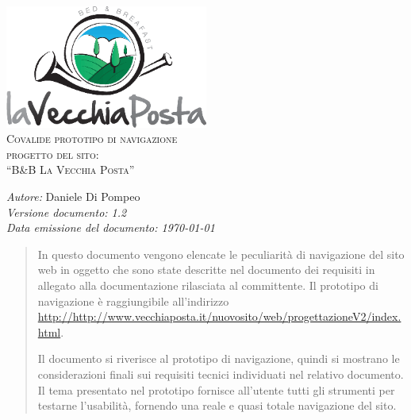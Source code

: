 \documentclass[a4paper,12pt,hidelinks]{report}
\begin{document}
  \begin{titlepage}
    \begin{center}
      \includegraphics[width=0.5\textwidth,keepaspectratio=true]{../../img/logo}\\[1cm]    
      \textsc{\LARGE Covalide prototipo di navigazione}\\[0.6cm]
      \textsc{\LARGE  progetto del sito:\\[0.5cm] ``B\&B La Vecchia Posta''}\\ [2.0cm]

      \begin{minipage}{0.8\textwidth}
	\begin{flushleft} \large
	  \emph{Autore:} Daniele Di Pompeo \\[0.5cm]
	  \emph{Versione documento: 1.2}\\[0.5cm]
	  \emph{Data emissione del documento: \today}\\[0.5cm]
	\end{flushleft}
      \end{minipage}
    \end{center}
  \end{titlepage}

 
\begin{abstract}
 In questo documento vengono elencate le peculiarità di navigazione del sito web in oggetto che sono state descritte nel documento dei requisiti in allegato
 alla documentazione rilasciata al committente.
 Il prototipo di navigazione è raggiungibile all'indirizzo \url{http://http://www.vecchiaposta.it/nuovosito/web/progettazioneV2/index.html}.
 \par Il documento si riverisce al prototipo di navigazione, quindi si mostrano le considerazioni finali sui requisiti tecnici individuati nel relativo documento.
 Il tema presentato nel prototipo fornisce all'utente tutti gli strumenti per testarne l'usabilità, fornendo una reale e quasi totale navigazione del sito.
\end{abstract}
\end{document}
